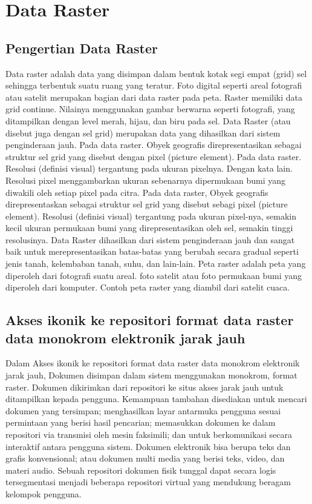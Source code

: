 
\section{Data Raster}
\subsection{Pengertian Data Raster}
Data raster adalah data yang disimpan dalam bentuk kotak segi empat (grid) sel sehingga terbentuk suatu ruang yang 
teratur. Foto digital seperti areal fotografi atau satelit merupakan bagian dari data raster pada peta. 
Raster memiliki data grid continue. Nilainya menggunakan gambar berwarna seperti fotografi, yang ditampilkan dengan 
level merah, hijau, dan biru pada sel. Data Raster (atau disebut juga dengan sel grid) merupakan data yang 
dihasilkan dari sistem penginderaan jauh. Pada data raster. Obyek geografis direpresentasikan sebagai struktur
sel grid yang disebut dengan pixel (picture element). Pada data raster. Resolusi (definisi visual) tergantung
pada ukuran pixelnya. Dengan kata lain. Resolusi pixel menggambarkan ukuran sebenarnya dipermukaan bumi 
yang diwakili oleh setiap pixel pada citra. Pada data raster, Obyek geografis direpresentaskan sebagai struktur sel grid yang disebut sebagi pixel (picture element). Resolusi (definisi visual) tergantung pada ukuran pixel-nya, semakin kecil ukuran permukaan bumi yang direpresentasikan oleh sel, semakin tinggi resolusinya. Data Raster dihasilkan dari sistem penginderaan jauh dan sangat baik untuk merepresentasikan batas-batas yang berubah secara gradual seperti jenis tanah, kelembaban tanah, suhu, dan lain-lain. Peta raster adalah peta yang diperoleh dari fotografi suatu areal. foto satelit atau foto permukaan bumi yang diperoleh dari komputer. Contoh peta raster yang diambil dari satelit cuaca.\cite{puntodewo2003sistem}

\subsection{Akses ikonik ke repositori format data raster data monokrom elektronik jarak jauh}
Dalam Akses ikonik ke repositori format data raster data monokrom elektronik jarak jauh, 
Dokumen disimpan dalam sistem menggunakan monokrom, format raster. 
Dokumen dikirimkan dari repositori ke situs akses jarak jauh untuk ditampilkan kepada pengguna. 
Kemampuan tambahan disediakan untuk mencari dokumen yang tersimpan; 
menghasilkan layar antarmuka pengguna sesuai permintaan yang berisi hasil pencarian; 
memasukkan dokumen ke dalam repositori via transmisi oleh mesin faksimili; 
dan untuk berkomunikasi secara interaktif antara pengguna sistem. 
Dokumen elektronik bisa berupa teks dan grafis konvensional; 
atau dokumen multi media yang berisi teks, video, dan materi audio. 
Sebuah repositori dokumen fisik tunggal dapat secara logis tersegmentasi menjadi
beberapa repositori virtual yang mendukung beragam kelompok pengguna.


